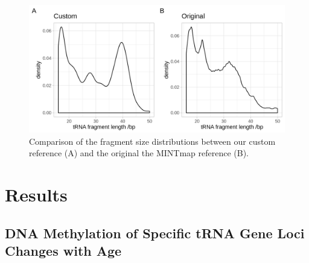 \documentclass[
]{book}
\begin{document}
\begin{figure}

{\centering \includegraphics[width=1\linewidth]{./figs/combinedFragSizeDists} 

}

\caption{Comparison of the fragment size distributions between our custom reference (A) and the original the MINTmap reference (B).}\label{fig:combinedFragSizeDists}
\end{figure}



\newpage

\hypertarget{res}{%
\section{Results}\label{res}}

\hypertarget{dna-methylation-of-specific-trna-gene-loci-changes-with-age}{%
\subsection{DNA Methylation of Specific tRNA Gene Loci Changes with Age}\label{dna-methylation-of-specific-trna-gene-loci-changes-with-age}}
\end{document}
